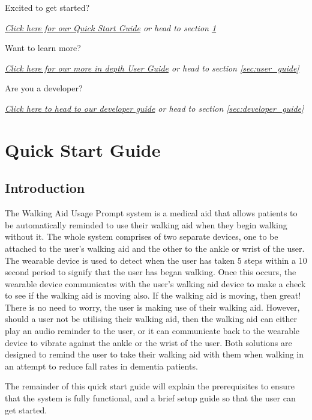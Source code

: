 		\vspace{1em}
		Excited to get started?

		\textit{\hyperref[sec:quick_start_guide]{Click here for our Quick Start Guide} or head to section \ref{sec:quick_start_guide}}

		\vspace{1em}
		Want to learn more?

		\textit{\hyperref[sec:user_guide]{Click here for our more in depth User Guide} or head to section \ref{sec:user_guide}}

		\vspace{1em}
		Are you a developer?

		\textit{\hyperref[sec:developer_guide]{Click here to head to our developer guide} or head to section \ref{sec:developer_guide}}

	\newpage
	\section{Quick Start Guide}
	\label{sec:quick_start_guide}

		\subsection{Introduction}
		\label{subsec:quick_start_guide_introduction}

			The Walking Aid Usage Prompt system is a medical aid that allows patients to be automatically reminded to use their walking aid when they begin walking without it. The whole system comprises of two separate devices, one to be attached to the user's walking aid and the other to the ankle or wrist of the user. The wearable device is used to detect when the user has taken 5 steps within a 10 second period to signify that the user has began walking. Once this occurs, the wearable device communicates with the user's walking aid device to make a check to see if the walking aid is moving also. If the walking aid is moving, then great! There is no need to worry, the user is making use of their walking aid. However, should a user not be utilising their walking aid, then the walking aid can either play an audio reminder to the user, or it can communicate back to the wearable device to vibrate against the ankle or the wrist of the user. Both solutions are designed to remind the user to take their walking aid with them when walking in an attempt to reduce fall rates in dementia patients.

			The remainder of this quick start guide will explain the prerequisites to ensure that the system is fully functional, and a brief setup guide so that the user can get started.

